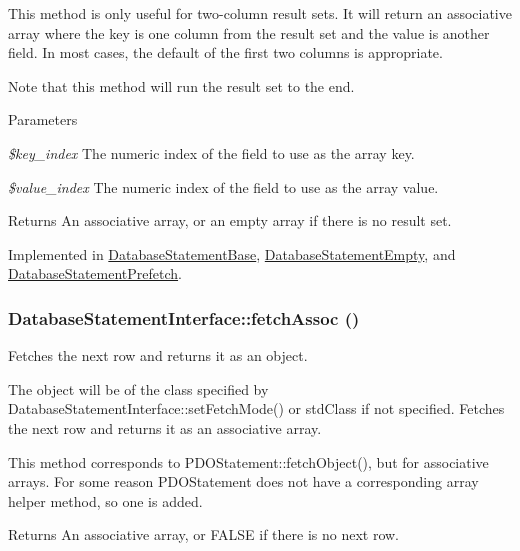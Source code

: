 This method is only useful for two-\/column result sets. It will return an associative array where the key is one column from the result set and the value is another field. In most cases, the default of the first two columns is appropriate.

Note that this method will run the result set to the end.


\begin{DoxyParams}{Parameters}
\item[{\em \$key\_\-index}]The numeric index of the field to use as the array key. \item[{\em \$value\_\-index}]The numeric index of the field to use as the array value.\end{DoxyParams}
\begin{DoxyReturn}{Returns}
An associative array, or an empty array if there is no result set. 
\end{DoxyReturn}


Implemented in \hyperlink{classDatabaseStatementBase_a1083f1060fd59bec06a7ae14dbc0b307}{DatabaseStatementBase}, \hyperlink{classDatabaseStatementEmpty_ab0bfa3541bdfb1f7003f15363911c99f}{DatabaseStatementEmpty}, and \hyperlink{classDatabaseStatementPrefetch_af374c6fa26265fe1cf9cd0cf87260849}{DatabaseStatementPrefetch}.\hypertarget{interfaceDatabaseStatementInterface_a754f04359c97c0866f5d80e785a24299}{
\subsubsection[{fetchAssoc}]{\setlength{\rightskip}{0pt plus 5cm}DatabaseStatementInterface::fetchAssoc ()}}
\label{interfaceDatabaseStatementInterface_a754f04359c97c0866f5d80e785a24299}
Fetches the next row and returns it as an object.

The object will be of the class specified by DatabaseStatementInterface::setFetchMode() or stdClass if not specified. Fetches the next row and returns it as an associative array.

This method corresponds to PDOStatement::fetchObject(), but for associative arrays. For some reason PDOStatement does not have a corresponding array helper method, so one is added.

\begin{DoxyReturn}{Returns}
An associative array, or FALSE if there is no next row. 
\end{DoxyReturn}


